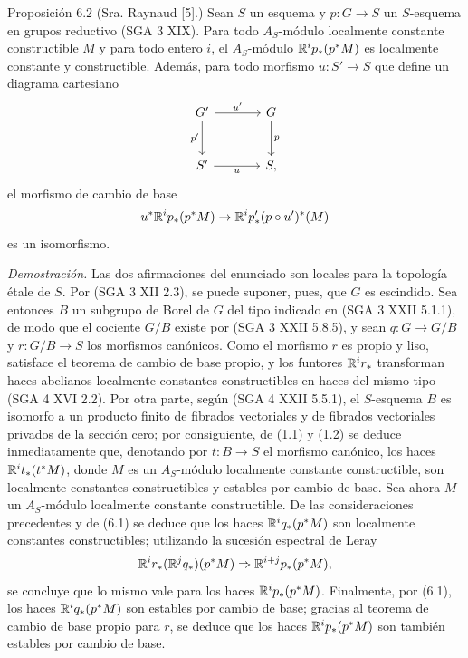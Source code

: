 \begin{statement}{Proposición 6.2}
(Sra. Raynaud [5].) Sean $S$ un esquema y $p:G\to S$ un $S$-esquema en grupos reductivo (SGA 3 XIX). Para todo $A_S$-módulo localmente constante constructible $M$ y para todo entero $i$, el $A_S$-módulo $\mathbb{R}^ip_*(p^*M)$ es localmente constante y constructible. Además, para todo morfismo $u:S'\to S$ que define un diagrama cartesiano
\[
\begin{tikzcd}[column sep=large,row sep=large]
G' \arrow[r,"u'"] \arrow[d,"p'"'] & G \arrow[d,"p"]\\
S' \arrow[r,"u"'] & S,
\end{tikzcd}
\]
el morfismo de cambio de base
\[
u^*\mathbb{R}^ip_*(p^*M)\to \mathbb{R}^ip'_*(p\circ u')^*(M)
\]
es un isomorfismo.
\end{statement}

\emph{Demostración.} Las dos afirmaciones del enunciado son locales para la topología étale de $S$. Por (SGA 3 XII 2.3), se puede suponer, pues, que $G$ es escindido. Sea entonces $B$ un subgrupo de Borel de $G$ del tipo indicado en (SGA 3 XXII 5.1.1), de modo que el cociente $G/B$ existe por (SGA 3 XXII 5.8.5), y sean $q:G\to G/B$ y $r:G/B\to S$ los morfismos canónicos. Como el morfismo $r$ es propio y liso, satisface el teorema de cambio de base propio, y los funtores $\mathbb{R}^ir_*$ transforman haces abelianos localmente constantes constructibles en haces del mismo tipo (SGA 4 XVI 2.2). Por otra parte, según (SGA 4 XXII 5.5.1), el $S$-esquema $B$ es isomorfo a un producto finito de fibrados vectoriales y de fibrados vectoriales privados de la sección cero; por consiguiente, de (1.1) y (1.2) se deduce inmediatamente que, denotando por $t:B\to S$ el morfismo canónico, los haces $\mathbb{R}^it_*(t^*M)$, donde $M$ es un $A_S$-módulo localmente constante constructible, son localmente constantes constructibles y estables por cambio de base. Sea ahora $M$ un $A_S$-módulo localmente constante constructible. De las consideraciones precedentes y de (6.1) se deduce que los haces $\mathbb{R}^iq_*(p^*M)$ son localmente constantes constructibles; utilizando la sucesión espectral de Leray
\[
\mathbb{R}^ir_*(\mathbb{R}^jq_*)(p^*M)\Rightarrow \mathbb{R}^{i+j}p_*(p^*M),
\]
se concluye que lo mismo vale para los haces $\mathbb{R}^ip_*(p^*M)$. Finalmente, por (6.1), los haces $\mathbb{R}^iq_*(p^*M)$ son estables por cambio de base; gracias al teorema de cambio de base propio para $r$, se deduce que los haces $\mathbb{R}^ip_*(p^*M)$ son también estables por cambio de base.

